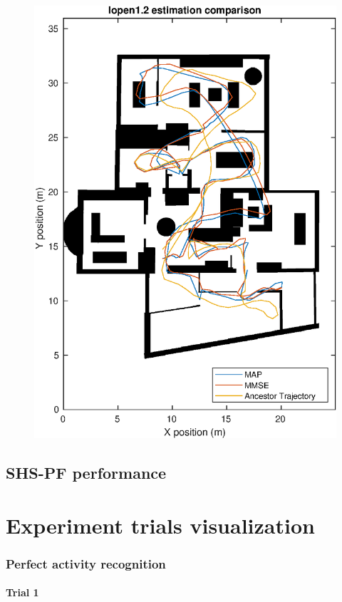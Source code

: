 \begin{figure}[H]
	\centering
	\includegraphics[width=0.5\linewidth]{images/20201108_1559_lopen1_2_estimation_comparison}
	\caption{}
	\label{fig:202011081559lopen12estimationcomparison}
\end{figure}




\section{SHS-PF performance}
\label{app:SHS-PF trials}




\chapter{Experiment trials visualization}
\subsection{Perfect activity recognition}
\newpage
\subsubsection{Trial 1}

